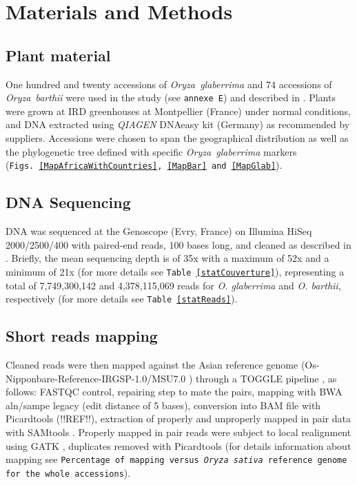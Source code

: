 \documentclass[10pt,letterpaper]{article}
\begin{document}
\section*{Materials and Methods}

 \subsection*{Plant material}
  One hundred and twenty accessions of \emph{Oryza~glaberrima} and 74 accessions of \emph{Oryza~barthii} were used in the study (see \texttt{annexe E}) and described in \cite{Cubry2017}. Plants were grown at IRD greenhouses at Montpellier (France) under normal conditions, and DNA extracted using \textit{QIAGEN} DNAeasy kit (Germany) as recommended by suppliers.
  Accessions were chosen to span the geographical distribution as well as the phylogenetic tree defined with specific \emph{Oryza~glaberrima} markers \cite{Orjuela2014} (\texttt{Figs.~\ref{MapAfricaWithCountries}, \ref{MapBar} and \ref{MapGlab}}).
  
  \subsection*{DNA Sequencing}
  DNA was sequenced at the Genoscope (Evry, France) on Illumina HiSeq 2000/2500/400 with paired-end reads, 100 bases long, and cleaned as described in \cite{Cubry2017, Djedatin2017}. Briefly, the mean sequencing depth is of 35x with a maximum of 52x and a minimum of 21x (for more details see   \texttt{Table~\ref{statCouverture}}), representing a total of 7,749,300,142 and 4,378,115,069 reads for \textit{O. glaberrima} and \textit{O. barthii}, respectively (for more details see \texttt{Table~\ref{statReads}}).

  \subsection*{Short reads mapping}
Cleaned reads were then mapped against the Asian reference genome (Os-Nipponbare-Reference-IRGSP-1.0/MSU7.0 \cite{Mcnally2009, Kawahara2013}) through a TOGGLE pipeline \cite{Monat2015, Tranchant2018}, as follows:
  FASTQC control, repairing step to mate the pairs, mapping with BWA aln/sampe legacy \cite{Li2009} (edit distance of 5 bases), conversion into BAM file with Picardtools (!!REF!!), extraction of properly and unproperly mapped in pair data with SAMtools \cite{Li2009a}. Properly mapped in pair reads were subject to  local realignment using GATK \cite{McKenna2010a}, duplicates removed with Picardtools (for details information about mapping see \texttt{Percentage of mapping versus \textit{Oryza sativa} reference genome for the whole accessions}).
  
\end{document}
